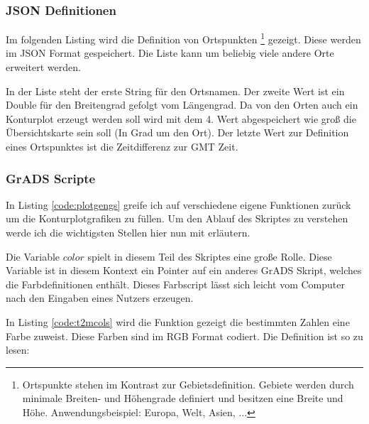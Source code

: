 \subsubsection*{JSON Definitionen}
Im folgenden Listing wird die Definition von Ortspunkten
\footnote{Ortspunkte stehen im Kontrast zur Gebietsdefinition. Gebiete werden durch minimale Breiten- und Höhengrade definiert und besitzen eine Breite und Höhe. Anwendungsbeispiel: Europa, Welt, Asien, ...} gezeigt.
Diese werden im JSON Format gespeichert.
Die Liste kann um beliebig viele andere Orte erweitert werden.

In der Liste steht der erste String für den Ortsnamen. Der zweite Wert ist ein Double für den Breitengrad gefolgt vom Längengrad.
Da von den Orten auch ein Konturplot erzeugt werden soll wird mit dem 4. Wert abgespeichert wie groß die Übersichtskarte sein soll (In Grad um den Ort).
Der letzte Wert zur Definition eines Ortspunktes ist die Zeitdifferenz zur GMT Zeit.

\subsubsection*{GrADS Scripte}


In Listing \ref{code:plotgengs} greife ich auf verschiedene eigene
Funktionen zurück um die Konturplotgrafiken zu füllen.
Um den Ablauf des Skriptes zu verstehen werde ich die wichtigsten Stellen hier nun mit erläutern.

Die Variable $color$ spielt in diesem Teil des Skriptes eine große Rolle.
Diese Variable ist in diesem Kontext ein Pointer auf ein anderes GrADS Skript,
welches die Farbdefinitionen enthält.
Dieses Farbscript lässt sich leicht vom Computer nach den Eingaben eines Nutzers erzeugen.

In Listing \ref{code:t2mcols} wird die Funktion gezeigt die bestimmten Zahlen eine Farbe zuweist.
Diese Farben sind im RGB Format codiert.
Die Definition ist so zu lesen:

